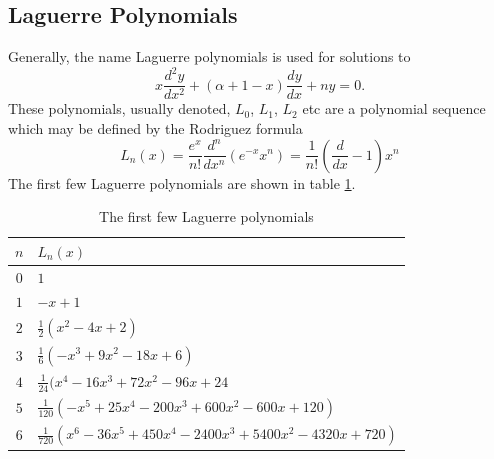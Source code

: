\documentclass[10pt, a4paper]{report}
\begin{document}
\begin{appendix}
\section{Laguerre Polynomials}
\label{app:laguerre}
Generally, the name Laguerre polynomials is used for solutions to 
\begin{equation}
x\frac{d^2y}{dx^2}+(\alpha+1-x)\frac{dy}{dx} + ny = 0.
\end{equation}
These polynomials, usually denoted, $L_0$, $L_1$, $L_2$ etc are a polynomial sequence which may be defined by the Rodriguez formula
\begin{equation}
L_n(x) = \frac{e^x}{n!}\frac{d^n}{dx^n}(e^{-x}x^n)=\frac{1}{n!}\left(\frac{d}{dx} -1 \right)x^n
\end{equation}
The first few Laguerre polynomials are shown in table \ref{tab:laguerre}.

\begin{table}[ht]
	\centering
	\caption{The first few Laguerre polynomials}
	\begin{tabular}{cl} \hline
	$n$ & $L_n(x)$  \\ \hline
	$0$ & $1$ \\
	$1$ & $-x+1$ \\
	$2$ & $\frac{1}{2}(x^2-4x+2)$ \\
	$3$ & $\frac{1}{6}(-x^3+9x^2-18x+6)$ \\
	$4$ & $\frac{1}{24}(x^4-16x^3+72x^2-96x+24$ \\
	$5$ & $\frac{1}{120}(-x^5+25x^4-200x^3+600x^2-600x+120) $ \\
	$6$ & $\frac{1}{720}(x^6-36x^5+450x^4-2400x^3+5400x^2-4320x+720)$ \\ \hline
	\end{tabular}
	\label{tab:laguerre}
\end{table}

\end{appendix}
\end{document}

